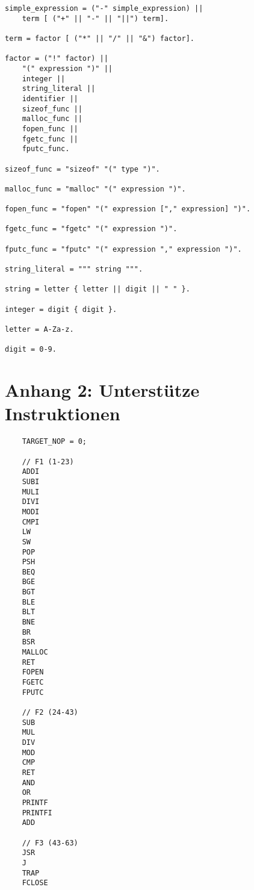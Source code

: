 \documentclass[a4paper]{article}
\begin{document}
\begin{lstlisting}
simple_expression = ("-" simple_expression) ||
	term [ ("+" || "-" || "||") term].

term = factor [ ("*" || "/" || "&") factor].

factor = ("!" factor) ||
	"(" expression ")" ||
	integer ||
	string_literal ||
	identifier ||
	sizeof_func ||
	malloc_func ||
	fopen_func ||
	fgetc_func ||
	fputc_func.

sizeof_func = "sizeof" "(" type ")".

malloc_func = "malloc" "(" expression ")".

fopen_func = "fopen" "(" expression ["," expression] ")".

fgetc_func = "fgetc" "(" expression ")".

fputc_func = "fputc" "(" expression "," expression ")".

string_literal = """ string """.

string = letter { letter || digit || " " }.

integer = digit { digit }.

letter = A-Za-z.

digit = 0-9.
	\end{lstlisting}

	\newpage
	\section{Anhang 2: Unterstütze Instruktionen}
	\begin{lstlisting}
	TARGET_NOP = 0;

	// F1 (1-23)
	ADDI
	SUBI
	MULI
	DIVI
	MODI
	CMPI
	LW
	SW
	POP
	PSH
	BEQ
	BGE
	BGT
	BLE
	BLT
	BNE
	BR
	BSR
	MALLOC
	RET
	FOPEN
	FGETC
	FPUTC

	// F2 (24-43)
	SUB
	MUL
	DIV
	MOD
	CMP
	RET
	AND
	OR
	PRINTF
	PRINTFI
	ADD

	// F3 (43-63)
	JSR
	J
	TRAP
	FCLOSE
	\end{lstlisting}
\end{document}
